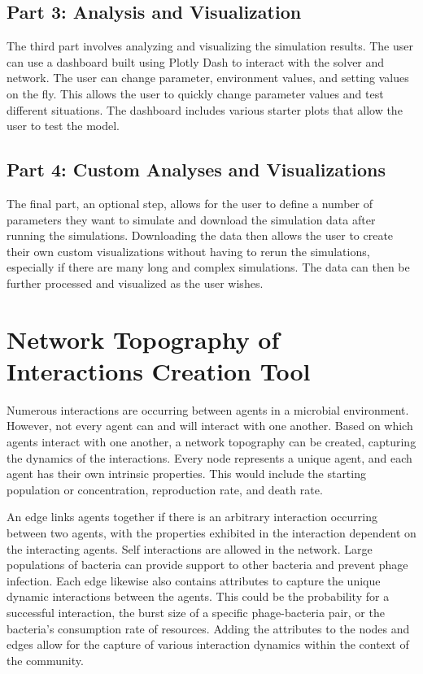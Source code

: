 \subsection{Part 3: Analysis and Visualization}
\label{sec:part3}
The third part involves analyzing and visualizing the simulation results.
The user can use a dashboard built using Plotly Dash to interact with the solver and network.
The user can change parameter, environment values, and setting values on the fly.
This allows the user to quickly change parameter values and test different situations.
The dashboard includes various starter plots that allow the user to test the model.


\subsection{Part 4: Custom Analyses and Visualizations}
\label{sec:part4}
The final part, an optional step, allows for the user to define a number of parameters they want to simulate and download the simulation data after running the simulations. 
Downloading the data then allows the user to create their own custom visualizations without having to rerun the simulations, especially if there are many long and complex simulations. 
The data can then be further processed and visualized as the user wishes. 


\section{Network Topography of Interactions Creation Tool}
Numerous interactions are occurring between agents in a microbial environment.
However, not every agent can and will interact with one another.
Based on which agents interact with one another, a network topography can be created, capturing the dynamics of the interactions.
Every node represents a unique agent, and each agent has their own intrinsic properties. 
This would include the starting population or concentration, reproduction rate, and death rate. \newline 

An edge links agents together if there is an arbitrary interaction occurring between two agents, with the properties exhibited in the interaction dependent on the interacting agents. 
Self interactions are allowed in the network. 
Large populations of bacteria can provide support to other bacteria and prevent phage infection. 
Each edge likewise also contains attributes to capture the unique dynamic interactions between the agents.
This could be the probability for a successful interaction, the burst size of a specific phage-bacteria pair, or the bacteria's consumption rate of resources.
Adding the attributes to the nodes and edges allow for the capture of various interaction dynamics within the context of the community.


